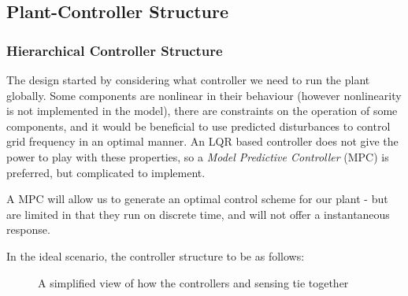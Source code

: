 \subsection{Plant-Controller Structure}
\subsubsection{Hierarchical Controller Structure}

The design started by considering what controller we need to run the plant globally. 
Some components are nonlinear in their behaviour (however nonlinearity is not implemented in the model), there are constraints on the operation of some components, and it would be beneficial to use predicted disturbances to control grid frequency in an optimal manner.
An LQR based controller does not give the power to play with these properties, so a \emph{Model Predictive Controller} (MPC) is preferred, but complicated to implement.

A MPC will allow us to  generate an optimal control scheme for our plant - but are limited in that they run on discrete time, and will not offer a instantaneous response.

In the ideal scenario, the controller structure to be as follows:

\begin{figure}[thb]
        \centering
\usetikzlibrary{arrows}
        \caption{A simplified view of how the controllers and sensing tie together} \label{fig:schematic}
\end{figure}

